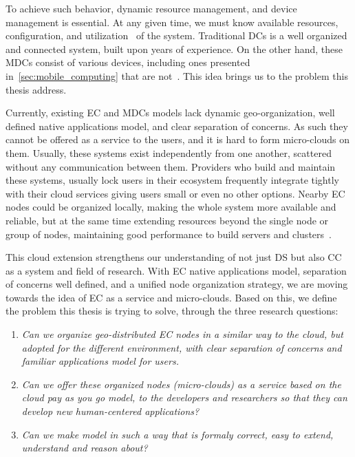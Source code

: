 To achieve such behavior, dynamic resource management, and device management is essential. At any given time, we must know available resources, configuration, and utilization~\cite{GubbiBMP13, WangZZWYW17} of the system. Traditional DCs is a well organized and connected system, built upon years of experience. On the other hand, these MDCs consist of various devices, including ones presented in~\ref{sec:mobile_computing} that are not~\cite{JiangCGZW19}. This idea brings us to the problem this thesis address.

Currently, existing EC and MDCs models lack dynamic geo-organization, well defined native applications model, and clear separation of concerns. As such they cannot be offered as a service to the users, and it is hard to form micro-clouds on them. Usually, these systems exist independently from one another, scattered without any communication between them. Providers who build and maintain these systems, usually lock users in their ecosystem frequently integrate tightly with their cloud services giving users small or even no other options. Nearby EC nodes could be organized locally, making the whole system more available and reliable, but at the same time extending resources beyond the single node or group of nodes, maintaining good performance to build servers and clusters~\cite{ArocaG12}.

This cloud extension strengthens our understanding of not just DS but also CC as a system and field of research. With EC native applications model, separation of concerns well defined, and a unified node organization strategy, we are moving towards the idea of EC as a service and micro-clouds. Based on this, we define the problem this thesis is trying to solve, through the three research questions:

\begin{enumerate}[start=1,label={(\bfseries \arabic*)}]\label{questions}
	\item \textit{Can we organize geo-distributed EC nodes in a similar way to the cloud, but adopted for the different environment, with clear separation of concerns and familiar applications model for users.}
	\item \textit{Can we offer these organized nodes (micro-clouds) as a service based on the cloud pay as you go model, to the developers and researchers so that they can develop new human-centered applications?}
	\item \textit{Can we make model in such a way that is formaly correct, easy to extend, understand and reason about?}
\end{enumerate}


